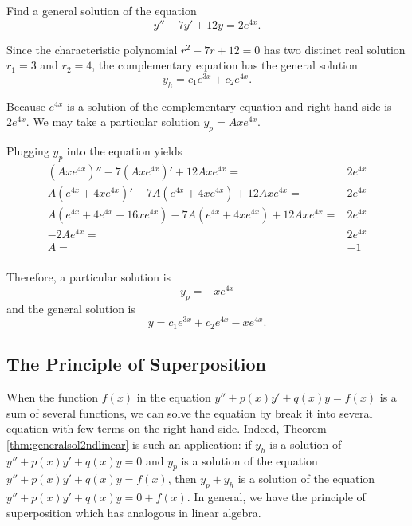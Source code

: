 \begin{exercise}
  Find a general solution of the equation
\[y''-7y'+12y=2e^{4x}.\]
\end{exercise}
\begin{exersol}
  Since the characteristic polynomial $r^2-7r+12=0$ has two distinct real solution $r_1=3$ and $r_2=4$, the complementary equation has the general solution
  \[y_h=c_1e^{3x}+c_2e^{4x}.\]

  Because $e^{4x}$ is a solution of the complementary equation and right-hand side is $2e^{4x}$. We may take a particular solution $y_p=Axe^{4x}$.

  Plugging $y_p$ into the equation yields
  \[
  \begin{aligned}
    (Axe^{4x})''-7(Axe^{4x})'+12Axe^{4x}=&2e^{4x}\\
    A(e^{4x}+4xe^{4x})'-7A(e^{4x}+4xe^{4x})+12Axe^{4x}=&2e^{4x}\\
    A(e^{4x}+4e^{4x}+16xe^{4x})-7A(e^{4x}+4xe^{4x})+12Axe^{4x}=&2e^{4x}\\
    -2Ae^{4x}=&2e^{4x}\\
    A=&-1\\
  \end{aligned}  
  \]

  Therefore, a particular solution is 
  \[y_p=-xe^{4x}\]
  and the general solution is
  \[y=c_1e^{3x}+c_2e^{4x}-xe^{4x}.\]
\end{exersol}


\subsection{The Principle of Superposition}

When the function $f(x)$ in the equation $y''+p(x)y'+q(x)y=f(x)$ is a sum of several functions, 
we can solve the equation by break it into several equation with few terms on the right-hand side. 
Indeed, Theorem \ref{thm:generalsol2ndlinear} is such an application: 
if $y_h$ is a solution of $y''+p(x)y'+q(x)y=0$ and $y_p$ is a solution of the equation $y''+p(x)y'+q(x)y=f(x)$, 
then $y_p+y_h$ is a solution of the equation $y''+p(x)y'+q(x)y=0+f(x)$. 
In general, we have the principle of superposition which has analogous in linear algebra.

